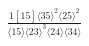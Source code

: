 \documentclass[varwidth, border=5pt]{standalone}
\begin{document}
\begin{my}
$\begin{gathered}
\scriptscriptstyle\frac{1[15]⟨35⟩^2⟨25⟩^2}{⟨15⟩⟨23⟩^3⟨24⟩⟨34⟩}
\end{gathered}$
\end{my}
\end{document}
